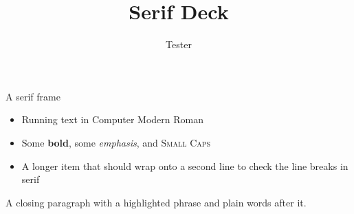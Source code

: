 \documentclass{beamer}
\title{Serif Deck}
\author{Tester}
\date{}
\begin{document}
\begin{frame}
  \titlepage
\end{frame}

\begin{frame}{A serif frame}
  \begin{itemize}
    \item Running text in Computer Modern Roman
    \item Some \textbf{bold}, some \emph{emphasis}, and \textsc{Small Caps}
    \item A longer item that should wrap onto a second line to check the line breaks in serif
  \end{itemize}
  \vspace{1em}
  A closing paragraph with a \alert{highlighted} phrase and plain words after it.
\end{frame}
\end{document}
